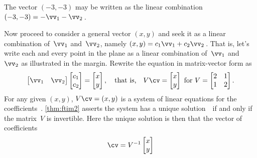 \begin{example}
\begin{solution}
\begin{parts}
\item The vector \((-3,-3)\) may be written as the linear combination
\((-3,-3)=-\vv_1-\vv_2\)\,. 

\end{parts}

Now proceed to consider a general vector \((x,y)\) and seek it as a linear combination of~\(\vv_1\) and~\(\vv_2\), namely \((x,y)=c_1\vv_1+c_2\vv_2\)\,.
That is, let's write each and every point in the plane as a linear combination of~\(\vv_1\) and~\(\vv_2\) as illustrated in the margin.
%
Rewrite the equation in matrix-vector form as
\begin{equation*}
\begin{bmatrix} \vv_1&\vv_2 \end{bmatrix}
\begin{bmatrix} c_1\\c_2 \end{bmatrix}
=\begin{bmatrix} x\\y \end{bmatrix}
,\quad\text{that is,}\quad
V\cv=\begin{bmatrix} x\\y \end{bmatrix}
\text{ for }V=\begin{bmatrix} 2&1\\1&2 \end{bmatrix}.
\end{equation*}
For any given \((x,y)\), \(V\cv=(x,y)\) is a system of linear equations for the coefficients~\cv.
\autoref{thm:ftim2} asserts the system has a unique solution~\cv\ if and only if the matrix~\(V\) is invertible.
Here the unique solution is then that the vector of coefficients
\begin{equation*}
\cv=V^{-1}\begin{bmatrix} x\\y \end{bmatrix}

\end{equation*}
\end{solution}
\end{example}
